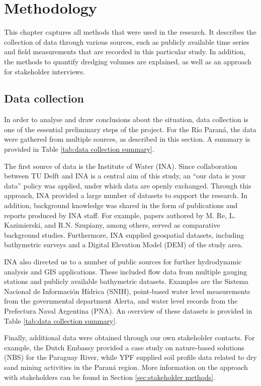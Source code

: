 \chapter{Methodology}
\label{chap:methodology}

This chapter captures all methods that were used in the research. It describes the collection of data through various sources, such as publicly available time series and field measurements that are recorded in this particular study. In addition, the methods to quantify dredging volumes are explained, as well as an approach for stakeholder interviews.

\section{Data collection}
In order to analyse and draw conclusions about the situation, data collection is one of the essential preliminary steps of the project. For the Río Paraná, the data were gathered from multiple sources, as described in this section. A summary is provided in Table \ref{tab:data collection summary}.

The first source of data is the Institute of Water (INA). Since collaboration between TU Delft and INA is a central aim of this study, an “our data is your data” policy was applied, under which data are openly exchanged. Through this approach, INA provided a large number of datasets to support the research. In addition, background knowledge was shared in the form of publications and reports produced by INA staff. For example, papers authored by M. Re, L. Kazimierski, and R.N. Szupiany, among others, served as comparative background studies. Furthermore, INA supplied geospatial datasets, including bathymetric surveys and a Digital Elevation Model (DEM) of the study area.

INA also directed us to a number of public sources for further hydrodynamic analysis and GIS applications. These included flow data from multiple gauging stations and publicly available bathymetric datasets. Examples are the Sistema Nacional de Información Hídrica (SNIH), point-based water level measurements from the governmental department Alerta, and water level records from the Prefectura Naval Argentina (PNA). An overview of these datasets is provided in Table \ref{tab:data collection summary}.

Finally, additional data were obtained through our own stakeholder contacts. For example, the Dutch Embassy provided a case study on nature-based solutions (NBS) for the Paraguay River, while YPF supplied soil profile data related to dry sand mining activities in the Paraná region. More information on the approach with stakeholders can be found in Section \ref{sec:stakeholder methods}.


